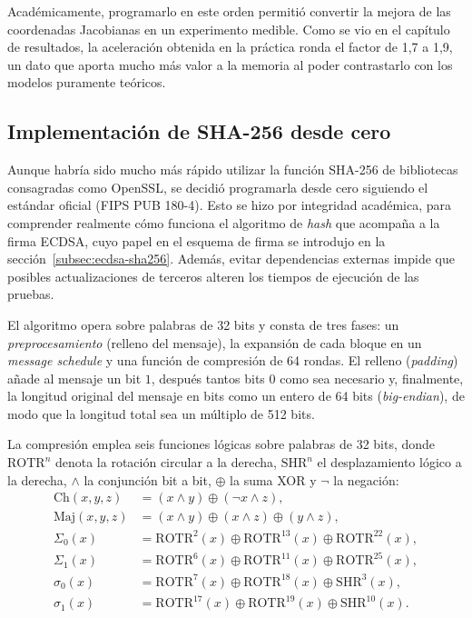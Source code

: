 Académicamente, programarlo en este orden permitió convertir la mejora de las coordenadas Jacobianas en un experimento medible. Como se vio en el capítulo de resultados, la aceleración 
obtenida en la práctica ronda el factor de 1,7 a 1,9, un dato que aporta mucho más valor a la memoria al poder contrastarlo con los modelos puramente teóricos.

\subsection{Implementación de SHA-256 desde cero}
\label{subsec:impl-sha256}

Aunque habría sido mucho más rápido utilizar la función SHA-256 de bibliotecas consagradas como OpenSSL, se decidió programarla desde cero siguiendo el estándar oficial (FIPS PUB 180-4). 
Esto se hizo por integridad académica, para comprender realmente cómo funciona el algoritmo de \textit{hash} que acompaña a la firma ECDSA, cuyo papel en el esquema de firma se introdujo en la sección~\ref{subsec:ecdsa-sha256}. Además, evitar dependencias externas impide que
posibles actualizaciones de terceros alteren los tiempos de ejecución de las pruebas.

El algoritmo opera sobre palabras de 32 bits y consta de tres fases: un \emph{preprocesamiento} (relleno del mensaje), la expansión de cada bloque en un \textit{message schedule} y una función de compresión de 64 rondas. El relleno (\textit{padding}) añade al mensaje un bit \(1\), después tantos bits \(0\) como sea necesario y, finalmente, la longitud original del mensaje en bits como un entero de 64 bits (\textit{big-endian}), de modo que la longitud total sea un múltiplo de 512 bits.

La compresión emplea seis funciones lógicas sobre palabras de 32 bits, donde \(\mathrm{ROTR}^{n}\) denota la rotación circular a la derecha, \(\mathrm{SHR}^{n}\) el desplazamiento lógico a la derecha, \(\wedge\) la conjunción bit a bit, \(\oplus\) la suma XOR y \(\lnot\) la negación:
\[
\begin{aligned}
\mathrm{Ch}(x,y,z) &= (x \wedge y) \oplus (\lnot x \wedge z), \\
\mathrm{Maj}(x,y,z) &= (x \wedge y) \oplus (x \wedge z) \oplus (y \wedge z), \\
\Sigma_0(x) &= \mathrm{ROTR}^{2}(x) \oplus \mathrm{ROTR}^{13}(x) \oplus \mathrm{ROTR}^{22}(x), \\
\Sigma_1(x) &= \mathrm{ROTR}^{6}(x) \oplus \mathrm{ROTR}^{11}(x) \oplus \mathrm{ROTR}^{25}(x), \\
\sigma_0(x) &= \mathrm{ROTR}^{7}(x) \oplus \mathrm{ROTR}^{18}(x) \oplus \mathrm{SHR}^{3}(x), \\
\sigma_1(x) &= \mathrm{ROTR}^{17}(x) \oplus \mathrm{ROTR}^{19}(x) \oplus \mathrm{SHR}^{10}(x).
\end{aligned}
\]

